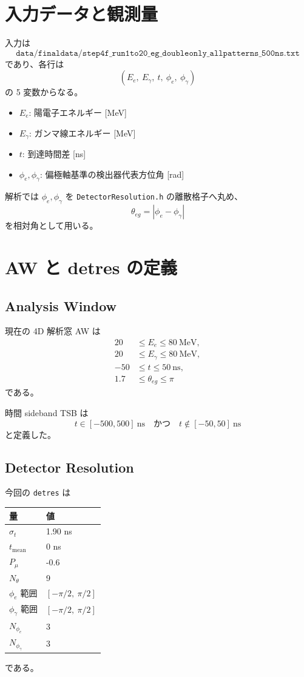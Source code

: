 \documentclass[a4paper,11pt]{jsarticle}
\begin{document}
\section{入力データと観測量}
入力は
\[
\texttt{data/finaldata/step4f\_run1to20\_eg\_doubleonly\_allpatterns\_500ns.txt}
\]
であり、各行は
\[
(E_e,\ E_\gamma,\ t,\ \phi_e,\ \phi_\gamma)
\]
の 5 変数からなる。

\begin{itemize}
  \item \(E_e\): 陽電子エネルギー [MeV]
  \item \(E_\gamma\): ガンマ線エネルギー [MeV]
  \item \(t\): 到達時間差 [ns]
  \item \(\phi_e,\phi_\gamma\): 偏極軸基準の検出器代表方位角 [rad]
\end{itemize}

解析では \(\phi_e,\phi_\gamma\) を \texttt{DetectorResolution.h} の離散格子へ丸め、
\[
\theta_{eg}=|\phi_e-\phi_\gamma|
\]
を相対角として用いる。

\section{AW と detres の定義}
\subsection{Analysis Window}
現在の 4D 解析窓 AW は
\begin{align}
20 &\le E_e \le 80\ \mathrm{MeV},\\
20 &\le E_\gamma \le 80\ \mathrm{MeV},\\
-50 &\le t \le 50\ \mathrm{ns},\\
1.7 &\le \theta_{eg} \le \pi
\end{align}
である。

時間 sideband TSB は
\[
t \in [-500,500]\ \mathrm{ns}
\quad\text{かつ}\quad
t \notin [-50,50]\ \mathrm{ns}
\]
と定義した。

\subsection{Detector Resolution}
今回の \texttt{detres} は
\begin{center}
\begin{tabular}{ll}
\toprule
量 & 値 \\
\midrule
\(\sigma_t\) & 1.90 ns \\
\(t_{\mathrm{mean}}\) & 0 ns \\
\(P_\mu\) & -0.6 \\
\(N_\theta\) & 9 \\
\(\phi_e\) 範囲 & \([-\pi/2,\ \pi/2]\) \\
\(\phi_\gamma\) 範囲 & \([-\pi/2,\ \pi/2]\) \\
\(N_{\phi_e}\) & 3 \\
\(N_{\phi_\gamma}\) & 3 \\
\bottomrule
\end{tabular}
\end{center}
である。
\end{document}

